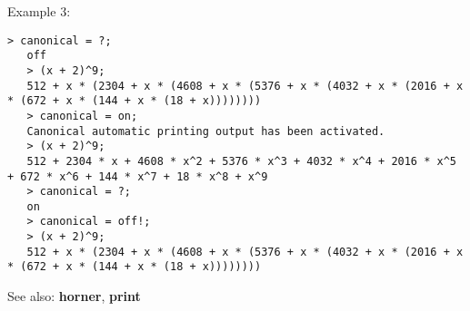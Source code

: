 \noindent Example 3: 
\begin{center}\begin{minipage}{14.8cm}\begin{Verbatim}[frame=single]
   > canonical = ?;
   off
   > (x + 2)^9;
   512 + x * (2304 + x * (4608 + x * (5376 + x * (4032 + x * (2016 + x * (672 + x * (144 + x * (18 + x))))))))
   > canonical = on;
   Canonical automatic printing output has been activated.
   > (x + 2)^9;
   512 + 2304 * x + 4608 * x^2 + 5376 * x^3 + 4032 * x^4 + 2016 * x^5 + 672 * x^6 + 144 * x^7 + 18 * x^8 + x^9
   > canonical = ?;
   on
   > canonical = off!;
   > (x + 2)^9;
   512 + x * (2304 + x * (4608 + x * (5376 + x * (4032 + x * (2016 + x * (672 + x * (144 + x * (18 + x))))))))
\end{Verbatim}
\end{minipage}\end{center}
See also: \textbf{horner}, \textbf{print}

